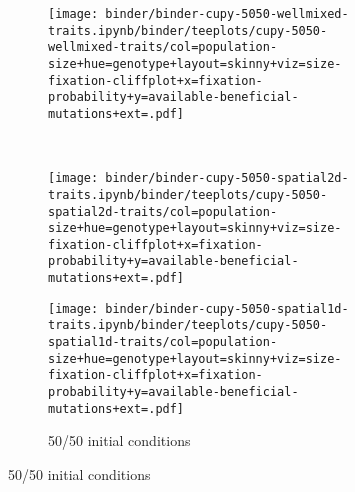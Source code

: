 \begin{figure}[h]
\begin{minipage}{\textwidth}
    \begin{subfigure}[b]{\linewidth}
        \begin{minipage}{0.3\textwidth}
          \texttt{[image: binder/binder-cupy-5050-wellmixed-traits.ipynb/binder/teeplots/cupy-5050-wellmixed-traits/col=population-size+hue=genotype+layout=skinny+viz=size-fixation-cliffplot+x=fixation-probability+y=available-beneficial-mutations+ext=.pdf]}%
        \end{minipage}%
        \begin{minipage}{0.06\textwidth}
          ~
        \end{minipage}%
        \begin{minipage}{0.26\textwidth}
          \texttt{[image: binder/binder-cupy-5050-spatial2d-traits.ipynb/binder/teeplots/cupy-5050-spatial2d-traits/col=population-size+hue=genotype+layout=skinny+viz=size-fixation-cliffplot+x=fixation-probability+y=available-beneficial-mutations+ext=.pdf]}%
        \end{minipage}%
        \begin{minipage}{0.25\textwidth}
          \texttt{[image: binder/binder-cupy-5050-spatial1d-traits.ipynb/binder/teeplots/cupy-5050-spatial1d-traits/col=population-size+hue=genotype+layout=skinny+viz=size-fixation-cliffplot+x=fixation-probability+y=available-beneficial-mutations+ext=.pdf]}%
        \end{minipage}%
      \begin{minipage}{0.12\textwidth}
        \raggedright
        \large
        \caption{50/50 initial conditions}
        \label{fig:wse-inf-one:32}
      \end{minipage}%
    \end{subfigure}%


\end{minipage}
\end{figure}
